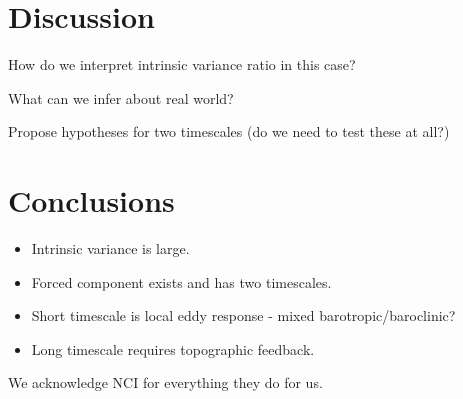 \documentclass{agujournal2019-navid}
\begin{document}
\section{Discussion}
How do we interpret intrinsic variance ratio in this case?

What can we infer about real world?

Propose hypotheses for two timescales (do we need to test these at all?)



\section{Conclusions}
\begin{itemize}
    \item Intrinsic variance is large.
    \item  Forced component exists and has two timescales.
    \item Short timescale is local eddy response - mixed  barotropic/baroclinic?
    \item Long timescale requires topographic feedback.

\end{itemize}



\acknowledgments
We acknowledge NCI for everything they do for us.


\end{document}
